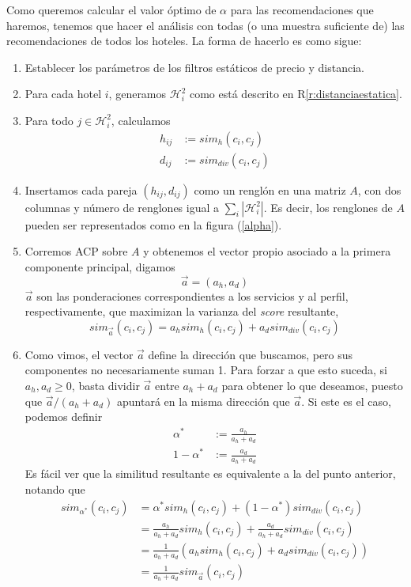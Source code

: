 \documentclass[12pt]{report}
\newcommand{\HH}{\mathcal{H}}
\begin{document}
Como queremos calcular el valor óptimo de $\alpha$ para las recomendaciones que haremos, tenemos que hacer el análisis con todas (o una muestra suficiente de) las recomendaciones de todos los hoteles. La forma de hacerlo es como sigue:
\begin{enumerate}
	\item Establecer los parámetros de los filtros estáticos de precio y distancia.
	\item Para cada hotel $i$, generamos $\HH_i^2$ como está descrito en R\ref{r:distanciaestatica}.
	\item Para todo $j \in \HH_i^2$, calculamos
	\begin{align*}
		h_{ij} &:= sim_h(c_i, c_j)\\
		d_{ij} &:= sim_{div}(c_i, c_j)
	\end{align*}
	\item Insertamos cada pareja $(h_{ij}, d_{ij})$ como un renglón en una matriz $A$, con dos columnas y número de renglones igual a $\sum_i |\HH_i^2|$. Es decir, los renglones de $A$ pueden ser representados como en la figura (\ref{alpha}).
	\item Corremos ACP sobre $A$ y obtenemos el vector propio asociado a la primera componente principal, digamos
	\[
	\vec{a} = (a_h, a_d)
	\]
	$\vec{a}$ son las ponderaciones correspondientes a los servicios y al perfil, respectivamente, que maximizan la varianza del \emph{score} resultante,
	\[
	sim_{\vec{a}}(c_i, c_j) = a_h sim_h(c_i, c_j) + a_d sim_{div}(c_i, c_j)
	\]
	\item Como vimos, el vector $\vec{a}$ define la dirección que buscamos, pero sus componentes no necesariamente suman 1. Para forzar a que esto suceda, si $a_h, a_d \geq 0$, basta dividir $\vec{a}$ entre $a_h + a_d$ para obtener lo que deseamos, puesto que $\vec{a} / (a_h + a_d)$ apuntará en la misma dirección que $\vec{a}$. Si este es el caso, podemos definir
	\begin{align*}
		\alpha^* &:= \frac{a_h}{a_h + a_d}\\
		1 - \alpha^* &:= \frac{a_d}{a_h + a_d}
	\end{align*}
	Es fácil ver que la similitud resultante es equivalente a la del punto anterior, notando que
	\begin{align*}
	sim_{\alpha^*}(c_i, c_j) &= \alpha^* sim_h(c_i, c_j) + (1 - \alpha^*) sim_{div}(c_i, c_j)\\
	&= \frac{a_h}{a_h + a_d} sim_h(c_i, c_j) + \frac{a_d}{a_h + a_d} sim_{div}(c_i, c_j)\\
	&= \frac{1}{a_h + a_d} (a_h sim_h(c_i, c_j) + a_d sim_{div}(c_i, c_j))\\
	&= \frac{1}{a_h + a_d} sim_{\vec{a}}(c_i, c_j)
	\end{align*}
\end{enumerate}
\end{document}
